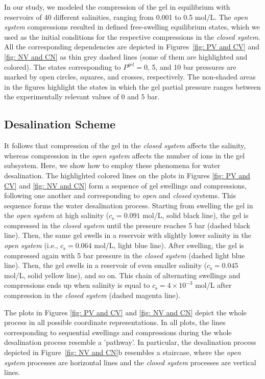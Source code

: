 \documentclass[gels,article,accept,pdftex,moreauthors]{Definitions/mdpi}
\newcommand{\ie}{{i.e.,} }
\newcommand{\cs}{c_{\mathrm{s}}}
\begin{document}
In our study, we modeled the compression of the gel in equilibrium with reservoirs of 40 different salinities, ranging from 0.001 to 0.5 mol/L. 
The \emph{open system} compressions resulted in defined free-swelling equilibrium states,
which we used as the initial conditions for the respective compressions in the \emph{closed system}. 
All the corresponding dependencies are depicted in Figures~\ref{fig: PV and CV} and \ref{fig: NV and CN} as thin grey dashed lines (some of them are highlighted and colored).
The states corresponding to $P^{gel}=0$, 5, and 10 bar pressures are marked by open circles, squares, and crosses, respectively. 
The non-shaded areas in the figures highlight the states in which the gel partial pressure ranges between the experimentally relevant values of 0 and 5 bar.

\subsection{Desalination Scheme}
It follows that compression of the gel in the \emph{closed system} affects the salinity, whereas compression in the \emph{open system} affects the number of ions in the gel subsystem. 
Here, we show how to employ these phenomena for water desalination. 
The highlighted colored lines on the plots in Figures \ref{fig: PV and CV} and \ref{fig: NV and CN} form a sequence of gel swellings and compressions, following one another and corresponding to  \emph{open} and \emph{closed} systems. 
This sequence forms the water desalination process.
Starting from swelling the gel in the \emph{open system} at high salinity ($\cs=0.091$ mol/L, solid black line), the gel is compressed in the \emph{closed system} until the pressure reaches 5 bar (dashed black line). 
Then, the same gel swells in a reservoir with slightly lower salinity in the \emph{open system} (\ie $\cs=0.064$ mol/L, light blue line). 
After swelling, the gel is compressed again with 5 bar pressure in the \emph{closed system} (dashed light blue line).  
Then, the gel swells in a reservoir of even smaller salinity ($\cs=0.045$ mol/L, solid yellow line), and so on. 
This chain of alternating swellings and compressions ends up when salinity is equal to $\cs=4\times10^{-3}$ mol/L after compression in the \emph{closed system} (dashed magenta line).

The plots in Figures \ref{fig: PV and CV} and \ref{fig: NV and CN} depict the whole process in all possible coordinate representations.
In all plots, the lines corresponding to sequential swellings and compressions during the whole desalination process resemble a 'pathway'.
In particular, the desalination process depicted in Figure~\ref{fig: NV and CN}b resembles a staircase,
where the \emph{open system} processes are horizontal lines and the \emph{closed system} processes are vertical lines.
\end{document}
